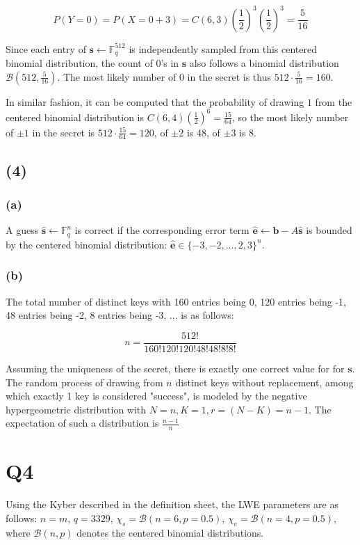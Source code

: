 \documentclass{article}
\begin{document}
$$
P(Y=0) = P(X = 0 + 3) = C(6, 3)(\frac{1}{2})^3(\frac{1}{2})^3 = \frac{5}{16}
$$

Since each entry of $\mathbf{s} \leftarrow \mathbb{F}_q^{512}$ is independently sampled from this centered binomial distribution, the count of $0$'s in $\mathbf{s}$ also follows a binomial distribution $\mathcal{B}(512, \frac{5}{16})$. The most likely number of $0$ in the secret is thus $512 \cdot \frac{5}{16} = 160$.

In similar fashion, it can be computed that the probability of drawing $1$ from the centered binomial distribution is $C(6, 4)(\frac{1}{2})^6 = \frac{15}{64}$, so the most likely number of $\pm 1$ in the secret is $512 \cdot \frac{15}{64} = 120$, of $\pm 2$ is 48, of $\pm 3$ is 8.

\subsection*{(4)}
\subsubsection*{(a)}
A guess $\hat{\mathbf{s}} \leftarrow \mathbb{F}_q^n$ is correct if the corresponding error term $\hat{\mathbf{e}} \leftarrow \mathbf{b} - A\hat{\mathbf{s}}$ is bounded by the centered binomial distribution: $\hat{\mathbf{e}} \in \{-3, -2, \ldots, 2, 3\}^n$.

\subsubsection*{(b)}
The total number of distinct keys with 160 entries being 0, 120 entries being -1, 48 entries being -2, 8 entries being -3, ... is as follows:

$$
n = \frac{512!}{160!120!120!48!48!8!8!}
$$

Assuming the uniqueness of the secret, there is exactly one correct value for for $\mathbf{s}$. The random process of drawing from $n$ distinct keys without replacement, among which exactly 1 key is considered "success", is modeled by the negative hypergeometric distribution with $N = n, K = 1, r = (N - K) = n - 1$. The expectation of such a distribution is $\frac{n-1}{n}$

\newpage

\section*{Q4}
Using the Kyber described in the definition sheet, the LWE parameters are as follows: $n = m$, $q = 3329$, $\chi_s = \mathcal{B}(n=6, p=0.5)$, $\chi_e = \mathcal{B}(n=4, p=0.5)$, where $\mathcal{B}(n, p)$ denotes the centered binomial distributions.
\end{document}
